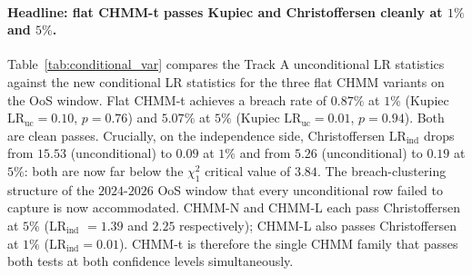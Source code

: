 \paragraph{Headline: flat CHMM-t passes Kupiec and Christoffersen cleanly at $1\%$ and $5\%$.}
Table~\ref{tab:conditional_var} compares the Track A unconditional LR statistics against the new conditional LR statistics for the three flat CHMM variants on the OoS window.
Flat CHMM-t achieves a breach rate of $0.87\%$ at $1\%$ (Kupiec $\text{LR}_{\text{uc}} = 0.10$, $p = 0.76$) and $5.07\%$ at $5\%$ (Kupiec $\text{LR}_{\text{uc}} = 0.01$, $p = 0.94$).
Both are clean passes.
Crucially, on the independence side, Christoffersen $\text{LR}_{\text{ind}}$ drops from $15.53$ (unconditional) to $0.09$ at $1\%$ and from $5.26$ (unconditional) to $0.19$ at $5\%$: both are now far below the $\chi^2_1$ critical value of $3.84$.
The breach-clustering structure of the $2024$-$2026$ OoS window that every unconditional row failed to capture is now accommodated.
CHMM-N and CHMM-L each pass Christoffersen at $5\%$ (LR$_{\text{ind}}$ $= 1.39$ and $2.25$ respectively); CHMM-L also passes Christoffersen at $1\%$ ($\text{LR}_{\text{ind}} = 0.01$).
CHMM-t is therefore the single CHMM family that passes both tests at both confidence levels simultaneously.

